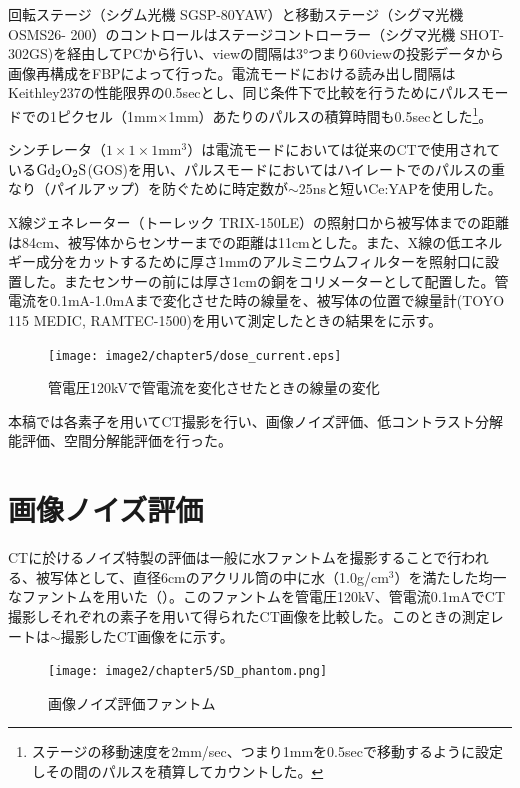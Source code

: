 回転ステージ（シグム光機 SGSP-80YAW）と移動ステージ（シグマ光機 OSMS26-
200）のコントロールはステージコントローラー（シグマ光機 SHOT-302GS)を経由してPCから行い、viewの間隔は3°つまり60viewの投影データから画像再構成をFBPによって行った。電流モードにおける読み出し間隔はKeithley237の性能限界の0.5secとし、同じ条件下で比較を行うためにパルスモードでの1ピクセル（1mm$\times$1mm）あたりのパルスの積算時間も0.5secとした\footnote{ステージの移動速度を2mm/sec、つまり1mmを0.5secで移動するように設定しその間のパルスを積算してカウントした。}。


シンチレータ（$1\times1\times1$mm$^3$）は電流モードにおいては従来のCTで使用されている$\rm Gd_2O_2S$(GOS)を用い、パルスモードにおいてはハイレートでのパルスの重なり（パイルアップ）を防ぐために時定数が$\sim$25nsと短いCe:YAPを使用した。

X線ジェネレーター（トーレック TRIX-150LE）の照射口から被写体までの距離は84cm、被写体からセンサーまでの距離は11cmとした。また、X線の低エネルギー成分をカットするために厚さ1mmのアルミニウムフィルターを照射口に設置した。またセンサーの前には厚さ1cmの銅をコリメーターとして配置した。管電流を0.1mA-1.0mAまで変化させた時の線量を、被写体の位置で線量計(TOYO 115 MEDIC, RAMTEC-1500)を用いて測定したときの結果をに示す。

\begin{figure}[H]
 \begin{center}
 \texttt{[image: image2/chapter5/dose\_current.eps]}
 \end{center}
 \caption{管電圧120kVで管電流を変化させたときの線量の変化}
 \label{fig:dose_current}
\end{figure}


本稿では各素子を用いてCT撮影を行い、画像ノイズ評価、低コントラスト分解能評価、空間分解能評価を行った。

\section{画像ノイズ評価\label{sec:noise}}
CTに於けるノイズ特製の評価は一般に水ファントムを撮影することで行われる、被写体として、直径6cmのアクリル筒の中に水（1.0g/cm$^3$）を満たした均一なファントムを用いた（）。このファントムを管電圧120kV、管電流0.1mAでCT撮影しそれぞれの素子を用いて得られたCT画像を比較した。このときの測定レートは$\sim$撮影したCT画像をに示す。

\begin{figure}[H]
 \begin{center}
 \texttt{[image: image2/chapter5/SD\_phantom.png]} 
 \end{center}
 \caption{画像ノイズ評価ファントム}
 \label{fig:SD_phantom}
\end{figure}


